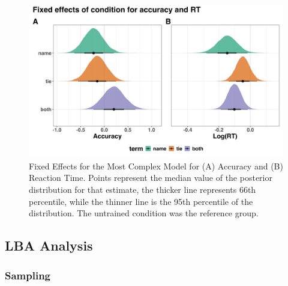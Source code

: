 \documentclass[
  man,floatsintext]{apa6}
\begin{document}
\begin{figure}[H]

{\centering \includegraphics[height=0.67\textheight,]{../../figures/manifest/fixef} 

}

\caption{Fixed Effects for the Most Complex Model for (A) Accuracy and (B) Reaction Time. Points represent the median value of the posterior distribution for that estimate, the thicker line represents 66th percentile, while the thinner line is the 95th percentile of the distribution. The untrained condition was the reference group.}\label{fig:fixef-plot}
\end{figure}

\subsection{LBA Analysis}\label{lba-analysis}

\subsubsection{Sampling}\label{sampling}
\end{document}
